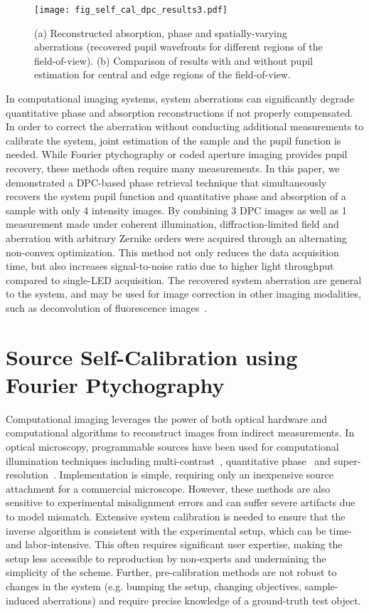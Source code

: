 \begin{figure}[ht!]
\centering\texttt{[image: fig\_self\_cal\_dpc\_results3.pdf]}
\caption{\label{fig:self_cal_dpc_experimentalresults3} (a) Reconstructed absorption, phase and spatially-varying aberrations (recovered pupil wavefronts for different regions of the field-of-view). (b) Comparison of results with and without pupil estimation for central and edge regions of the field-of-view.}
\end{figure}

In computational imaging systems, system aberrations can significantly degrade quantitative phase and absorption reconstructions if not properly compensated. In order to correct the aberration without conducting additional measurements to calibrate the system, joint estimation of the sample and the pupil function is needed. While Fourier ptychography or coded aperture imaging provides pupil recovery, these methods often require many measurements. In this paper, we demonstrated a DPC-based phase retrieval technique that simultaneously recovers the system pupil function and quantitative phase and absorption of a sample with only 4 intensity images. By combining 3 DPC images as well as 1 measurement made under coherent illumination, diffraction-limited field and aberration with arbitrary Zernike orders were acquired through an alternating non-convex optimization. This method not only reduces the data acquisition time, but also increases signal-to-noise ratio due to higher light throughput compared to single-LED acquisition. The recovered system aberration are general to the system, and may be used for image correction in other imaging modalities, such as deconvolution of fluorescence images~\cite{Chung2016}.

\section{Source Self-Calibration using Fourier Ptychography}\label{sec:selfcal:fpm}

Computational imaging leverages the power of both optical hardware and computational algorithms to reconstruct images from indirect measurements. In optical microscopy, programmable sources have been used for computational illumination techniques including multi-contrast~\cite{Zheng2011,Liu2014}, quantitative phase~\cite{Zheng2013,Tian14,tian2015quantitative,Chen2016} and super-resolution~\cite{Zheng2013,ou2013quantitative,Dong:14,Tian2014}. Implementation is simple, requiring only an inexpensive source attachment for a commercial microscope. However, these methods are also sensitive to experimental misalignment errors and can suffer severe artifacts due to model mismatch. Extensive system calibration is needed to ensure that the inverse algorithm is consistent with the experimental setup, which can be time- and labor-intensive. This often requires significant user expertise, making the setup less accessible to reproduction by non-experts and undermining the simplicity of the scheme. Further, pre-calibration methods are not robust to changes in the system (e.g. bumping the setup, changing objectives, sample-induced aberrations) and require precise knowledge of a ground-truth test object.

